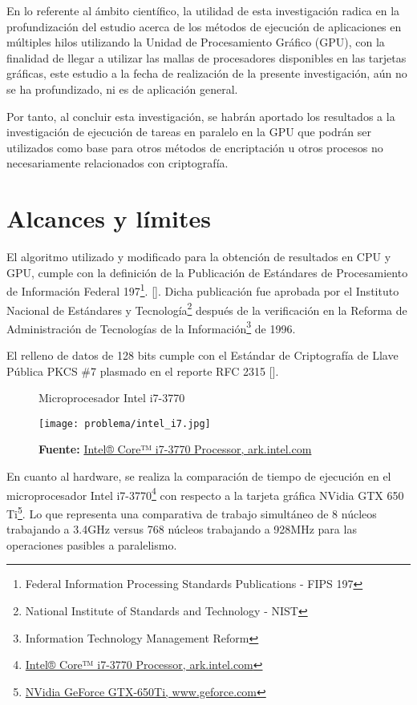 \documentclass[../main/main.tex]{subfiles}
\begin{document}
  En lo referente al ámbito científico, la utilidad de esta investigación radica en la profundización del estudio acerca de los métodos de ejecución de aplicaciones en múltiples hilos utilizando la Unidad de Procesamiento Gráfico (GPU), con la finalidad de llegar a utilizar las mallas de procesadores disponibles en las tarjetas gráficas, este estudio a la fecha de realización de la presente investigación, aún no se ha profundizado, ni es de aplicación general.

  Por tanto, al concluir esta investigación, se habrán aportado los resultados a la investigación de ejecución de tareas en paralelo en la GPU que podrán ser utilizados como base para otros métodos de encriptación u otros procesos no necesariamente relacionados con criptografía.

  \section{Alcances y límites} \label{limites_alcances}

  El algoritmo utilizado y modificado para la obtención de resultados en CPU y GPU, cumple con la definición de la Publicación de Estándares de Procesamiento de Información Federal 197\footnote{Federal Information Processing Standards Publications - FIPS 197}. [\cite{report:FIPS_197}]. Dicha publicación fue aprobada por el Instituto Nacional de Estándares y Tecnología\footnote{National Institute of Standards and Technology - NIST} después de la verificación en la Reforma de Administración de Tecnologías de la Información\footnote{Information Technology Management Reform} de 1996.

  El relleno de datos de 128 bits cumple con el Estándar de Criptografía de Llave Pública PKCS \#7 plasmado en el reporte RFC 2315 [\cite{report:RFC_2315}].

  \begin{figure}
    \centering
    \caption{Microprocesador Intel i7-3770}
    \texttt{[image: problema/intel\_i7.jpg]}
    \caption*{\textbf{Fuente:} \href{https://tinyurl.com/yb3tqpvu}{Intel® Core™ i7-3770 Processor, ark.intel.com}}
  \end{figure}

  En cuanto al hardware, se realiza la comparación de tiempo de ejecución en el microprocesador Intel i7-3770\footnote{\href{https://tinyurl.com/yb3tqpvu}{Intel® Core™ i7-3770 Processor, ark.intel.com}} con respecto a la tarjeta gráfica NVidia GTX 650 Ti\footnote{\href{https://tinyurl.com/ycr3kouv}{NVidia GeForce GTX-650Ti, www.geforce.com}}. Lo que representa una comparativa de trabajo simultáneo de 8 núcleos trabajando a 3.4GHz versus 768 núcleos trabajando a 928MHz para las operaciones pasibles a paralelismo.
\end{document}
